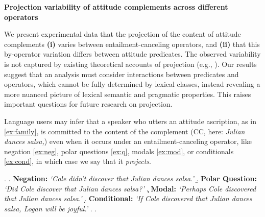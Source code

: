 \documentclass[12pt, a4paper]{article}
\begin{document}

\enablehyphenation

\begin{center}
	\textbf{\large%
		Projection variability of attitude complements across different operators}
\end{center}

\vspace{-.7\baselineskip}
\noindent 
	We present experimental data that the projection of the content of attitude complements \textbf{(i)} varies between entailment-canceling operators, and \textbf{(ii)} that this by-operator variation differs between attitude predicates.
	The observed variability is not captured by existing theoretical accounts of projection
	(e.g., \citealt{heim_projection_1983,van_der_sandt_presupposition_1992,abrusan_predicting_2011,schlenker_triggering_2021}).
	Our results suggest that an analysis must consider interactions between predicates and operators, which cannot be fully determined by lexical classes, instead revealing a more nuanced picture of lexical semantic and pragmatic properties. This raises important questions for future research on projection.

	Language users may infer that a speaker who utters an attitude ascription, as in \ref{ex:family}, is committed to the content of the complement (CC, here: \emph{Julian dances salsa,})
	even when it occurs under an entailment-canceling operator, like negation \ref{ex:neg}, polar questions \ref{ex:q}, modals \ref{ex:mod}, or conditionals \ref{ex:cond}, in which case we say that it \emph{projects}.

	\vspace{-.5\baselineskip}
	\ex. \label{ex:family}
		\a. \label{ex:neg}
			{\bf Negation:} \hfill
			\emph{\lq Cole didn't discover that Julian dances salsa.\rq}
		\b. \label{ex:q}
			{\bf Polar Question:} \hfill
			\emph{\lq Did Cole discover that Julian dances salsa?\rq}
		\c. \label{ex:mod}
			{\bf Modal:} \hfill
			\emph{\lq Perhaps Cole discovered that Julian dances salsa.\rq}
		\d. \label{ex:cond}
			{\bf Conditional:} \hfill
			\emph{\lq If Cole discovered that Julian dances salsa, Logan will be joyful.\rq}
		\z.
	\z.
	
\end{document}
